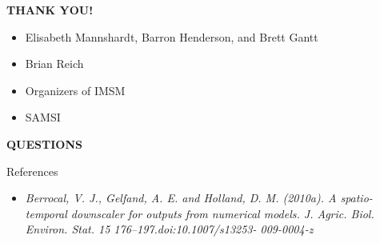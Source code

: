 \documentclass{beamer}
\begin{document}
\begin{frame}
\begin{center}\textbf{THANK YOU!}\end{center}
\begin{itemize}
\item Elisabeth Mannshardt, Barron Henderson, and Brett Gantt
\item Brian Reich
\item Organizers of IMSM
\item SAMSI
\end{itemize}

\vspace{7mm}
\begin{center}
\textbf{QUESTIONS}
\end{center}
\end{frame}

\begin{frame}{References}
\begin{itemize}
    
    \small\item \textit{Berrocal, V. J., Gelfand, A. E. and Holland, D. M. (2010a). A spatio-temporal downscaler for
    outputs from numerical models. J. Agric. Biol. Environ. Stat. 15 176–197.doi:10.1007/s13253-
    009-0004-z}
\end{itemize}
\end{frame}
\end{document}
